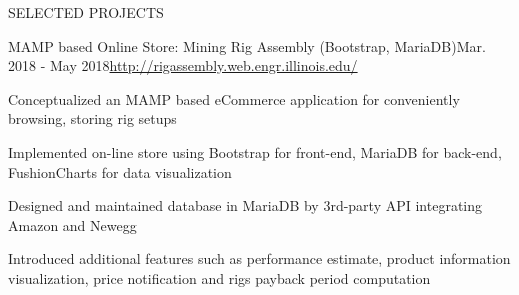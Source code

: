 \documentclass{resume} %
\begin{document}
\begin{rSection}{SELECTED PROJECTS}



\begin{rSubsection}{MAMP based Online Store: Mining Rig Assembly (Bootstrap, MariaDB)}{Mar. 2018 - May 2018}{\url{http://rigassembly.web.engr.illinois.edu/}}{}
\item Conceptualized an MAMP based eCommerce application for conveniently browsing, storing rig setups 
\item Implemented on-line store using Bootstrap for front-end, MariaDB for back-end, FushionCharts for data visualization
\item Designed and maintained database in MariaDB by 3rd-party API integrating Amazon and Newegg
\item Introduced additional features such as performance estimate, product information visualization, price notification and rigs payback period computation
\end{rSubsection}




\end{rSection} 
\end{document}

